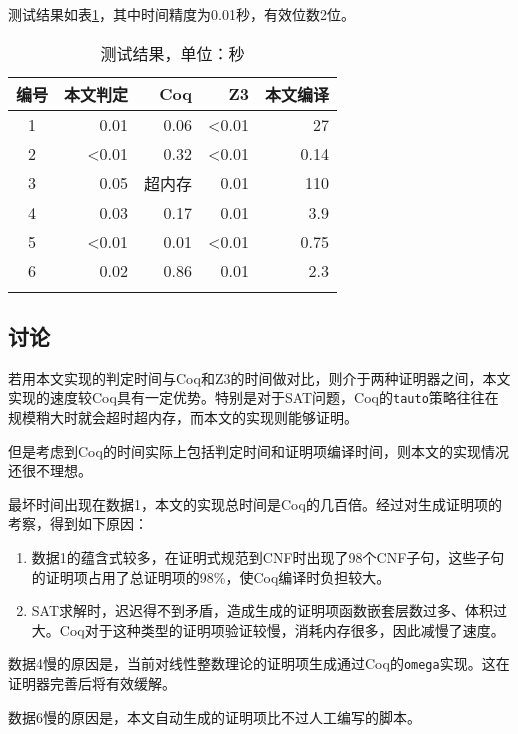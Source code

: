 测试结果如表\ref{tab:res}，其中时间精度为0.01秒，有效位数2位。
\begin{table}[!ht]
  \caption{测试结果，单位：秒}
  \label{tab:res}
  \centering
  \begin{tabular}{crrrr}
    \whline
    编号 & 本文判定 & Coq & Z3 & 本文编译 \\
    \hline
    1 & 0.01 & 0.06 & <0.01 & 27 \\
    2 & <0.01 & 0.32 & <0.01 & 0.14 \\
    3 & 0.05 & 超内存 & 0.01 & 110 \\
    4 & 0.03 & 0.17 & 0.01 & 3.9 \\
    5 & <0.01 & 0.01 & <0.01 & 0.75 \\
    6 & 0.02 & 0.86 & 0.01 & 2.3 \\
    \whline
  \end{tabular}
\end{table}

\subsection{讨论}
若用本文实现的判定时间与Coq和Z3的时间做对比，则介于两种证明器之间，本文实现的速度较Coq具有一定优势。特别是对于SAT问题，Coq的\texttt{tauto}策略往往在规模稍大时就会超时超内存，而本文的实现则能够证明。

但是考虑到Coq的时间实际上包括判定时间和证明项编译时间，则本文的实现情况还很不理想。

最坏时间出现在数据1，本文的实现总时间是Coq的几百倍。经过对生成证明项的考察，得到如下原因：
\begin{enumerate}
  \item 数据1的蕴含式较多，在证明式规范到CNF时出现了98个CNF子句，这些子句的证明项占用了总证明项的98\%，使Coq编译时负担较大。
  \item SAT求解时，迟迟得不到矛盾，造成生成的证明项函数嵌套层数过多、体积过大。Coq对于这种类型的证明项验证较慢，消耗内存很多，因此减慢了速度。
\end{enumerate}

数据4慢的原因是，当前对线性整数理论的证明项生成通过Coq的\texttt{omega}实现。这在证明器完善后将有效缓解。

数据6慢的原因是，本文自动生成的证明项比不过人工编写的脚本。
